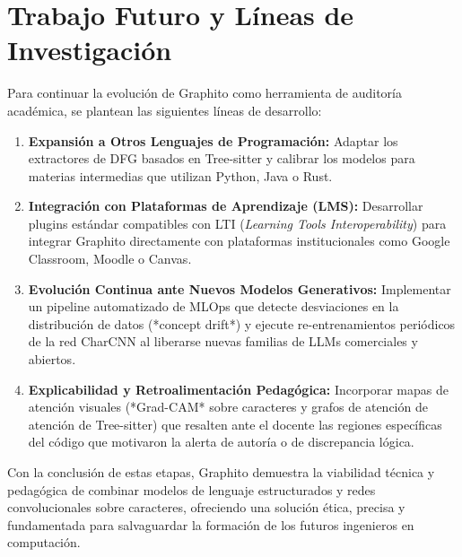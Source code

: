 \section{Trabajo Futuro y Líneas de Investigación}
\label{sec:trabajo_futuro}

Para continuar la evolución de Graphito como herramienta de auditoría académica, se plantean las siguientes líneas de desarrollo:

\begin{enumerate}
    \item \textbf{Expansión a Otros Lenguajes de Programación:} Adaptar los extractores de DFG basados en Tree-sitter y calibrar los modelos para materias intermedias que utilizan Python, Java o Rust.
    
    \item \textbf{Integración con Plataformas de Aprendizaje (LMS):} Desarrollar plugins estándar compatibles con LTI (\textit{Learning Tools Interoperability}) para integrar Graphito directamente con plataformas institucionales como Google Classroom, Moodle o Canvas.
    
    \item \textbf{Evolución Continua ante Nuevos Modelos Generativos:} Implementar un pipeline automatizado de MLOps que detecte desviaciones en la distribución de datos (*concept drift*) y ejecute re-entrenamientos periódicos de la red CharCNN al liberarse nuevas familias de LLMs comerciales y abiertos.
    
    \item \textbf{Explicabilidad y Retroalimentación Pedagógica:} Incorporar mapas de atención visuales (*Grad-CAM* sobre caracteres y grafos de atención de atención de Tree-sitter) que resalten ante el docente las regiones específicas del código que motivaron la alerta de autoría o de discrepancia lógica.
\end{enumerate}

Con la conclusión de estas etapas, Graphito demuestra la viabilidad técnica y pedagógica de combinar modelos de lenguaje estructurados y redes convolucionales sobre caracteres, ofreciendo una solución ética, precisa y fundamentada para salvaguardar la formación de los futuros ingenieros en computación.